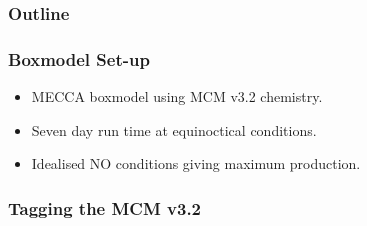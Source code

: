 \begin{frame}
    \frametitle{Outline} 
    \begin{flushleft}
        \tableofcontents[currentsection]
    \end{flushleft}
\end{frame} 

\begin{frame}
    \frametitle{Boxmodel Set-up}

    \begin{itemize}
        \item MECCA boxmodel using MCM v3.2 chemistry. \vspace{3mm}
        \item Seven day run time at equinoctical conditions. \vspace{3mm}
        \item Idealised NO conditions giving maximum  production. 
    \end{itemize}
\end{frame}

\begin{frame}
    \frametitle{Tagging the MCM v3.2}
    \vspace{-4.5mm}

    \begin{center}
        
    \end{center}
\end{frame}
